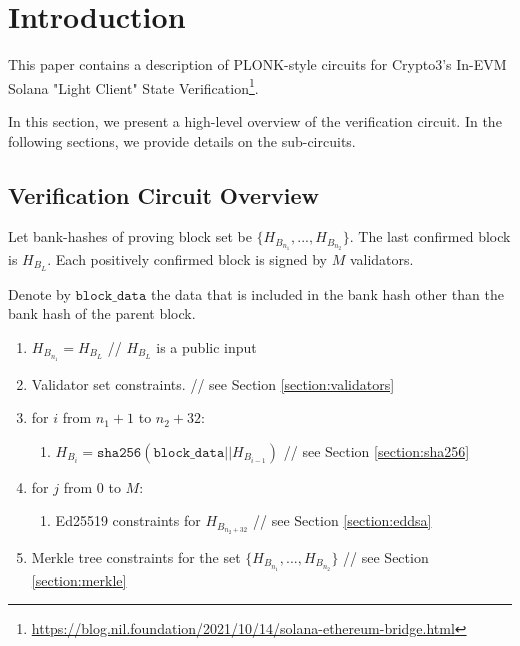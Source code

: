 \section{Introduction}
\label{section:introduction}
This paper contains a description of PLONK-style circuits for Crypto3's In-EVM Solana "Light Client" State Verification\footnote{\url{https://blog.nil.foundation/2021/10/14/solana-ethereum-bridge.html}}.

In this section, we present a high-level overview of the verification circuit.
In the following sections, we provide details on the sub-circuits.

\subsection{Verification Circuit Overview}

Let bank-hashes of proving block set be $\{H_{B_{n_1}}, ..., H_{B_{n_2}}\}$.
The last confirmed block is $H_{B_{L}}$.
Each positively confirmed block is signed by $M$ validators.

Denote by $\texttt{block\_data}$ the data that is included in the bank hash other than the bank hash of the parent block.

\begin{enumerate}
    \item $H_{B_{n_1}} = H_{B_{L}}$ // $ H_{B_{L}}$ is a public input
    \item Validator set constraints. // see Section \ref{section:validators}
    \item for $i$ from $n_1 + 1$ to $n_2 + 32$:
    \begin{enumerate}
        \item $H_{B_i} = \texttt{sha256}(\texttt{block\_data} || H_{B_{i - 1}})$ // see Section \ref{section:sha256}
    \end{enumerate}
    \item for $j$ from $0$ to $M$:
    \begin{enumerate}
        \item Ed25519 constraints for $H_{B_{n_2 + 32}}$ // see Section \ref{section:eddsa}
    \end{enumerate}
    \item Merkle tree constraints for the set $\{H_{B_{n_1}}, ..., H_{B_{n_2}}\}$ // see Section \ref{section:merkle}
\end{enumerate}